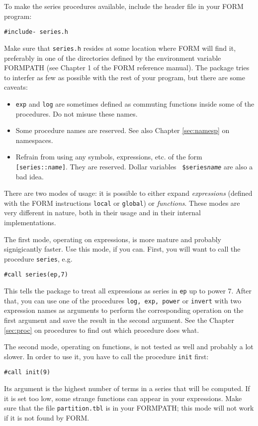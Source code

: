 \documentclass{article}
\begin{document}
To make the series procedures available, include the header file in your
FORM program:
\begin{verbatim}
#include- series.h
\end{verbatim}
Make sure that {\tt series.h} resides at some location where FORM will find
it, preferably in one of the directories defined by the environment
variable \mbox{FORMPATH} (see Chapter 1 of the FORM reference manual). The
package tries to interfer as few as possible with the rest of your
program, but there are some caveats:
\begin{itemize}
\item {\tt exp} and {\tt log} are sometimes defined as commuting
  functions inside some of the procedures. Do not misuse these names.
\item Some procedure names are reserved. See also Chapter
  \ref{sec:namesp} on namespaces.
\item Refrain from  using any symbols, expressions, etc. of the form
  {\tt[series::{\it name}]}. They are reserved. Dollar variables {\tt
    \$series{\it name}} are also a bad idea.
\end{itemize}

There are two modes of usage: it is possible to either expand {\em expressions}
(defined with the FORM instructions {\tt local} or {\tt global}) or {\em
  functions}. These modes are very different in nature, both in their
usage and in their internal implementations. 

The first mode, operating on expressions, is more mature and probably
signigicantly faster. Use this mode, if you can. First, you will want to
call the procedure {\tt series}, e.g.
\begin{verbatim}
#call series(ep,7)
\end{verbatim}
This tells the package to treat all expressions as series in {\tt ep} up
to power 7. After that, you can use one of the procedures {\tt log, exp,
  power} or {\tt invert} with two expression names as arguments to perform the
corresponding operation on the first argument and save the result in the
second argument. See the Chapter \ref{sec:proc} on procedures to find
out which procedure does what.

\medskip

The second mode, operating on functions, is not tested as well and
probably a lot slower. In order to use it, you have to call the
procedure {\tt init} first:
\begin{verbatim}
#call init(9)
\end{verbatim}
Its argument is the highest number of terms in a series that will be
computed. If it is set too low, some strange functions can appear in
your expressions. Make sure that the file {\tt partition.tbl} is in your
FORMPATH; this mode will not work if it is not found by FORM.
\end{document}
